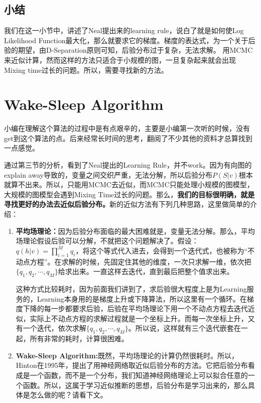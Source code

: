 \documentclass[a4paper]{article}
\begin{document}
\subsection{小结}
我们在这一小节中，讲述了Neal提出来的learning rule，说白了就是如何使Log Likelihood Function最大化，那么就要求它的梯度。梯度的表达式，为一个关于后验的期望，由D-Separation原则可知，后验分布过于复杂，无法求解。
用MCMC来近似计算，然而这样的方法只适合于小规模的图，一旦复杂起来就会出现Mixing time过长的问题。所以，需要寻找新的方法。

\section{Wake-Sleep Algorithm}
小编在理解这个算法的过程中是有点艰辛的，主要是小编第一次听的时候，没有get到这个算法的点。后来经常长时间的思考，翻阅了不少其他的资料才总算找到一点感觉。

通过第三节的分析，看到了Neal提出的Learning Rule，并不work。因为有向图的explain away导致的，变量之间交织严重，无法分解，所以后验分布$P(S|v)$根本就算不出来。所以，只能用MCMC去近似，而MCMC只能处理小规模的图模型，大规模的图模型会遇到Mixing Time过长的问题。那么，\textbf{我们的目标很明确，就是寻找更好的办法去近似后验分布。}新的近似方法有下列几种思路，这里做简单的介绍：
\begin{enumerate}
    \item \textbf{平均场理论：}因为后验分布面临的最大困难就是，变量无法分解。那么，平均场理论假设后验可以分解，不就把这个问题解决了。假设：$q(h|v) = \prod_{i=1}^M q_i$，将这个等式代入进去，会得到一个迭代式，也被称为“不动点方程”。在求解的时候，先固定住其他的维度，一次只求解一维，依次把$\{ q_1,q_2,\cdots,q_M \}$给求出来。一直这样去迭代，直到最后把整个值求出来。
    
    这种方式比较耗时，因为前面我们讲到了，求后验很大程度上是为Learning服务的，Learning本身用的是梯度上升或下降算法，所以这里有一个循环。在梯度下降的每一步都要求后验，后验在平均场理论下用一个不动点方程去迭代近似，实际上不动点方程的求解过程就是一个坐标上升。而每一次坐标上升，又有一个迭代，依次求解$\{ q_1,q_2,\cdots,q_M \}$。所以说，这样就有三个迭代嵌套在一起，所有非常的耗时，计算很困难。
    \item \textbf{Wake-Sleep Algorithm:}既然，平均场理论的计算仍然很耗时。所以，Hinton在1995年，提出了用神经网络取近似后验分布的方法。它把后验分布看成是一个函数，而不是一个分布，我们知道神经网络理论上可以拟合任意的一个函数。所以，这属于学习近似推断的思想，后验分布是学习出来的，那么具体是怎么做的呢？请看下文。
\end{enumerate}
\end{document}
